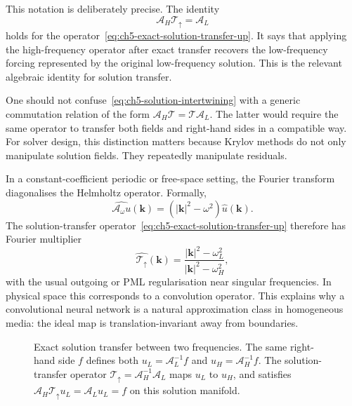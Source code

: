 This notation is deliberately precise. The identity
\begin{equation}
    \mathcal{A}_H\mathcal{T}_{\uparrow}
    =
    \mathcal{A}_L
    \label{eq:ch5-solution-intertwining}
\end{equation}
holds for the operator~\eqref{eq:ch5-exact-solution-transfer-up}. It says that
applying the high-frequency operator after exact transfer recovers the
low-frequency forcing represented by the original low-frequency solution. This
is the relevant algebraic identity for solution transfer.

One should not confuse~\eqref{eq:ch5-solution-intertwining} with a generic
commutation relation of the form
$\mathcal{A}_H\mathcal{T}=\mathcal{T}\mathcal{A}_L$. The latter would require
the same operator to transfer both fields and right-hand sides in a compatible
way. For solver design, this distinction matters because Krylov methods do not
only manipulate solution fields. They repeatedly manipulate residuals.

In a constant-coefficient periodic or free-space setting, the Fourier transform
diagonalises the Helmholtz operator. Formally,
\begin{equation}
    \widehat{\mathcal{A}_\omega u}(\mathbf{k})
    =
    \left(|\mathbf{k}|^2-\omega^2\right)\hat{u}(\mathbf{k}).
    \label{eq:ch5-fourier-symbol-A}
\end{equation}
The solution-transfer operator~\eqref{eq:ch5-exact-solution-transfer-up}
therefore has Fourier multiplier
\begin{equation}
    \widehat{\mathcal{T}_{\uparrow}}(\mathbf{k})
    =
    \frac{|\mathbf{k}|^2-\omega_L^2}
         {|\mathbf{k}|^2-\omega_H^2},
    \label{eq:ch5-fourier-symbol-transfer}
\end{equation}
with the usual outgoing or PML regularisation near singular frequencies. In
physical space this corresponds to a convolution operator. This explains why a
convolutional neural network is a natural approximation class in homogeneous
media: the ideal map is translation-invariant away from boundaries.

\begin{figure}[htbp]
    \centering
    \caption{Exact solution transfer between two frequencies. The same
    right-hand side $f$ defines both $u_L=\mathcal{A}_L^{-1}f$ and
    $u_H=\mathcal{A}_H^{-1}f$. The solution-transfer operator
    $\mathcal{T}_{\uparrow}=\mathcal{A}_H^{-1}\mathcal{A}_L$ maps $u_L$ to
    $u_H$, and satisfies
    $\mathcal{A}_H\mathcal{T}_{\uparrow}u_L=\mathcal{A}_L u_L=f$ on this
    solution manifold.}
    \label{fig:ch5-solution-transfer-schematic}
\end{figure}

